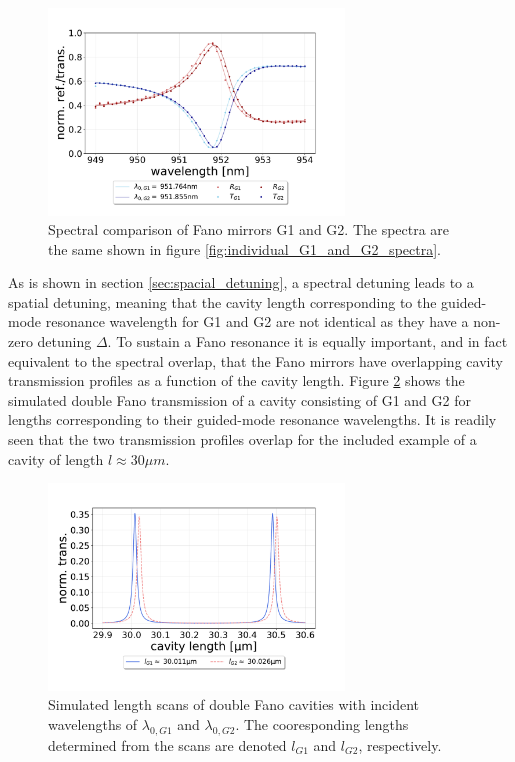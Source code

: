 \begin{figure}[h!]
    \centering
    \includegraphics[width=0.7\textwidth]{figures/results/M3:M5/M3:M5_initial_spectra.pdf}
    \caption{Spectral comparison of Fano mirrors G1 and G2. The spectra are the same shown in figure \ref{fig:individual_G1_and_G2_spectra}.}
    \label{fig:G1_and_G2_spectral_comparison}
\end{figure}

As is shown in section \ref{sec:spacial_detuning}, a spectral detuning leads to a spatial detuning, meaning that the cavity length corresponding to the guided-mode resonance wavelength for G1 and G2 are not identical as they have a non-zero detuning $\Delta$. To sustain a Fano resonance it is equally important, and in fact equivalent to the spectral overlap, that the Fano mirrors have overlapping cavity transmission profiles as a function of the cavity length. Figure \ref{fig:G1/G2_length_scan} shows the simulated double Fano transmission of a cavity consisting of G1 and G2 for lengths corresponding to their guided-mode resonance wavelengths. It is readily seen that the two transmission profiles overlap for the included example of a cavity of length $l \approx 30 \mu m$.

\begin{figure}[h!]
    \centering
    \includegraphics[width=0.7\textwidth]{figures/results/M3:M5_length_scan_sim_30um.pdf}
    \caption{Simulated length scans of double Fano cavities with incident wavelengths of $\lambda_{0,G1}$ and $\lambda_{0,G2}$. The cooresponding lengths determined from the scans are denoted $l_{G1}$ and $l_{G2}$, respectively.}
    \label{fig:G1/G2_length_scan}
\end{figure}

